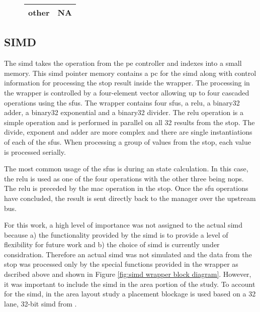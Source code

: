 \begin{figure}[h]
\begin{minipage}{1\textwidth}
\begin{minipage}{1\textwidth}
\begin{minipage}[t]{1\textwidth}
\begin{minipage}[t]{0.25\textwidth}
\begin{adjustbox}{width=1\textwidth}
\begin{tabular}{ |c|c|  }
                other  & NA       \\
                \hline
              \end{tabular}
          \end{adjustbox}
        \end{minipage}
      \end{minipage}
    \end{minipage}
    \label{tab:stOp op fields}
  \end{minipage}
\end{figure}


\subsection{SIMD}
\label{sec:simd}

The \ac{simd} takes the operation from the \ac{pe} controller and indexes into a small memory. This \ac{simd} pointer memory contains a \ac{pc} for the \ac{simd} along with control information for processing the \ac{stop} result inside the wrapper.
The processing in the wrapper is controlled by a four-element vector allowing up to four cascaded operations using the \acp{sfu}.
The wrapper contains four \acp{sfu}, a \ac{relu}, a \ac{binary32} adder, a \ac{binary32} exponential and a \ac{binary32} divider.
The \ac{relu} operation is a simple operation and is performed in parallel on all 32 results from the \ac{stop}.
The divide, exponent and adder are more complex and there are single instantiations of each of the \acp{sfu}.
When processing a group of values from the \ac{stop}, each value is processed serially.

The most common usage of the \acp{sfu} is during \ac{an} state calculation. In this case, the \ac{relu} is used as one of the four operations with the other three being \acp{nop}.
The \ac{relu} is preceded by the \ac{mac} operation in the \ac{stop}.
Once the \ac{sfu} operations have concluded, the result is sent directly back to the manager over the upstream bus.

For this work, a high level of importance was not assigned to the actual \ac{simd} because a) the functionality provided by the \ac{simd} is to provide a level of flexibility for future work and b) the choice of \ac{simd} is currently under considration.
Therefore an actual \ac{simd} was not simulated and the data from the \ac{stop} was processed only by the special functions provided in the wrapper as dscribed above and shown in Figure \ref{fig:simd wrapper block diagram}.
However, it was important to include the \ac{simd} in the area portion of the study.
To account for the \ac{simd}, in the area layout study a placement blockage is used based on a 32 lane, 32-bit \ac{simd} from \cite{schabel2014diss}.

